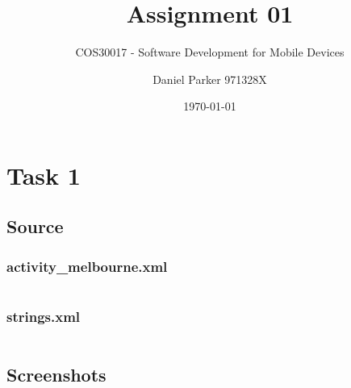 \documentclass[11pt,english,numbers=endperiod,parskip=full]{scrartcl}
\title{Assignment 01}
\subtitle{COS30017 - Software Development for Mobile Devices}
\author{Daniel Parker 971328X}
\date{\today}
\begin{document}
\maketitle

\section{Task 1}
\subsection{Source}
\subsubsection{activity\_melbourne.xml}
\inputminted{xml}{../../Apps/Melbourne/app/src/main/res/layout/activity_melbourne.xml}

\subsubsection{strings.xml}
\inputminted{xml}{../../Apps/Melbourne/app/src/main/res/values/strings.xml}

\subsection{Screenshots}
\setlength\fboxsep{0pt}
\setlength\fboxrule{0.5pt}
\\
\bigskip
{}
\\
\end{document}
